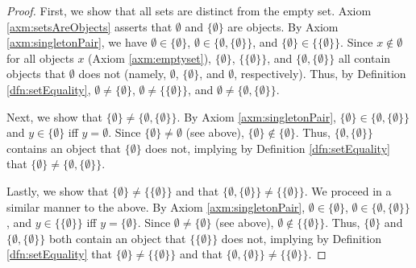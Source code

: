 \documentclass[../main.tex]{subfiles}
\begin{document}
\begin{enumerate}[ref={\thesection.\arabic*}]
\begin{proof}
        First, we show that all sets are distinct from the empty set. Axiom \ref{axm:setsAreObjects} asserts that $\emptyset$ and $\{\emptyset\}$ are objects. By Axiom \ref{axm:singletonPair}, we have $\emptyset\in\{\emptyset\}$, $\emptyset\in\{\emptyset,\{\emptyset\}\}$, and $\{\emptyset\}\in\{\{\emptyset\}\}$. Since $x\notin\emptyset$ for all objects $x$ (Axiom \ref{axm:emptyset}), $\{\emptyset\}$, $\{\{\emptyset\}\}$, and $\{\emptyset,\{\emptyset\}\}$ all contain objects that $\emptyset$ does not (namely, $\emptyset$, $\{\emptyset\}$, and $\emptyset$, respectively). Thus, by Definition \ref{dfn:setEquality}, $\emptyset\neq\{\emptyset\}$, $\emptyset\neq\{\{\emptyset\}\}$, and $\emptyset\neq\{\emptyset,\{\emptyset\}\}$.\par
        Next, we show that $\{\emptyset\}\neq\{\emptyset,\{\emptyset\}\}$. By Axiom \ref{axm:singletonPair}, $\{\emptyset\}\in\{\emptyset,\{\emptyset\}\}$ and $y\in\{\emptyset\}$ iff $y=\emptyset$. Since $\{\emptyset\}\neq\emptyset$ (see above), $\{\emptyset\}\notin\{\emptyset\}$. Thus, $\{\emptyset,\{\emptyset\}\}$ contains an object that $\{\emptyset\}$ does not, implying by Definition \ref{dfn:setEquality} that $\{\emptyset\}\neq\{\emptyset,\{\emptyset\}\}$.\par
        Lastly, we show that $\{\emptyset\}\neq\{\{\emptyset\}\}$ and that $\{\emptyset,\{\emptyset\}\}\neq\{\{\emptyset\}\}$. We proceed in a similar manner to the above. By Axiom \ref{axm:singletonPair}, $\emptyset\in\{\emptyset\}$, $\emptyset\in\{\emptyset,\{\emptyset\}\}$, and $y\in\{\{\emptyset\}\}$ iff $y=\{\emptyset\}$. Since $\emptyset\neq\{\emptyset\}$ (see above), $\emptyset\notin\{\{\emptyset\}\}$. Thus, $\{\emptyset\}$ and $\{\emptyset,\{\emptyset\}\}$ both contain an object that $\{\{\emptyset\}\}$ does not, implying by Definition \ref{dfn:setEquality} that $\{\emptyset\}\neq\{\{\emptyset\}\}$ and that $\{\emptyset,\{\emptyset\}\}\neq\{\{\emptyset\}\}$.\par

\end{proof}
\end{enumerate}
\end{document}
